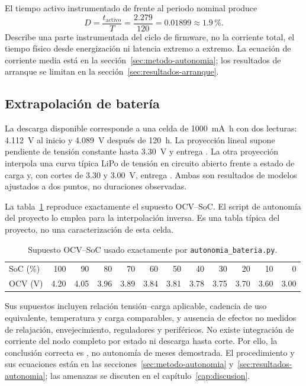 El tiempo activo instrumentado de \TiempoActivo{} frente al periodo nominal produce
\begin{equation}
D=\frac{t_{\mathrm{activo}}}{T}=\frac{2.279}{120}=0.01899
\approx1.9\,\text{\%}.
\label{eq:anexo-duty}
\end{equation}
Describe una parte instrumentada del ciclo de firmware, no la corriente total, el tiempo físico desde energización ni latencia extremo a extremo. La ecuación de corriente media está en la sección~\ref{sec:metodo-autonomia}; los resultados de arranque se limitan en la sección~\ref{sec:resultados-arranque}.

\subsection{Extrapolación de batería}

La descarga disponible corresponde a una celda de \SI{1000}{\milli\ampere\hour} con dos lecturas: \SI{4.112}{\volt} al inicio y \SI{4.089}{\volt} después de \SI{120}{\hour}. La proyección lineal supone pendiente de tensión constante hasta \SI{3.30}{\volt} y entrega \AutonomiaLinealEstimada{}. La otra proyección interpola una curva típica LiPo de tensión en circuito abierto frente a estado de carga y, con cortes de 3.30 y \SI{3.00}{\volt}, entrega \AutonomiaModeloEstimada{}. Ambas son resultados de modelos ajustados a dos puntos, no duraciones observadas.

La tabla~\ref{tab:anexo-ocv-soc} reproduce exactamente el supuesto OCV--SoC. El script de autonomía del proyecto lo emplea para la interpolación inversa. Es una tabla típica del proyecto, no una caracterización de esta celda.

\begin{table}[htbp]
\centering
\small
\caption{Supuesto OCV--SoC usado exactamente por \texttt{autonomia\_bateria.py}.}
\label{tab:anexo-ocv-soc}
\begin{tabular}{@{}l*{11}{r}@{}}
\toprule
SoC (\%) & 100 & 90 & 80 & 70 & 60 & 50 & 40 & 30 & 20 & 10 & 0 \\
OCV (V) & 4.20 & 4.05 & 3.96 & 3.89 & 3.84 & 3.81 & 3.78 & 3.75 & 3.70 & 3.60 & 3.00 \\
\bottomrule
\end{tabular}
\end{table}

Sus supuestos incluyen relación tensión--carga aplicable, cadencia de uso equivalente, temperatura y carga comparables, y ausencia de efectos no medidos de relajación, envejecimiento, reguladores y periféricos. No existe integración de corriente del nodo completo por estado ni descarga hasta corte. Por ello, la conclusión correcta es \EstadoAutonomia{}, no autonomía de meses demostrada. El procedimiento y sus ecuaciones están en las secciones~\ref{sec:metodo-autonomia} y~\ref{sec:resultados-autonomia}; las amenazas se discuten en el capítulo~\ref{cap:discusion}.

